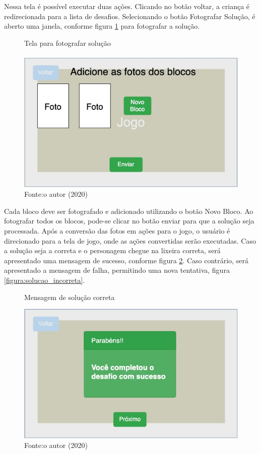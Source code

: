     Nessa tela é possível executar duas ações.
    Clicando no botão voltar, a criança é redirecionada para a lista de desafios.
    Selecionando o botão Fotografar Solução, é aberto uma janela, conforme figura \ref{figura:fotografar_blocos} para fotografar a solução.
    
    \begin{figure}[h!]
        \centering
        \caption{Tela para fotografar solução}
        \includegraphics[width=12cm]{images/cap3/Fotografar_blocos.jpg}
        \caption*{Fonte:o autor (2020)}
        \label{figura:fotografar_blocos}
    \end{figure}
    
    Cada bloco deve ser fotografado e adicionado utilizando o botão Novo Bloco.
    Ao fotografar todos os blocos, pode-se clicar no botão enviar para que a solução seja processada.
    Após a conversão das fotos em ações para o jogo, o usuário é direcionado para a tela de jogo, onde as ações convertidas serão executadas.
    Caso a solução seja a correta e o personagem chegue na lixeira correta, será apresentado uma mensagem de sucesso, conforme figura \ref{figura:solucao_correta}. Caso contrário, será apresentado a mensagem de falha, permitindo uma nova tentativa, figura \ref{figura:solucao_incorreta}.
    
    \begin{figure}[h!]
        \centering
        \caption{Mensagem de solução correta}
        \includegraphics[width=12cm]{images/cap3/solucao_correta.jpg}
        \caption*{Fonte:o autor (2020)}
        \label{figura:solucao_correta}
    \end{figure}
    
